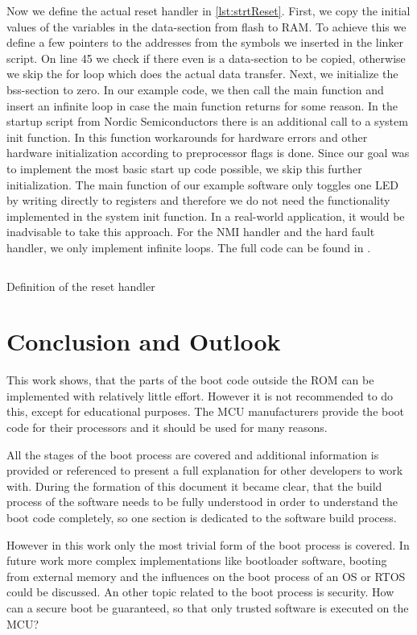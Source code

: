 \documentclass[a4paper,12pt]{article}
\begin{document}
Now we define the actual reset handler in \autoref{lst:strtReset}. First, we copy the initial values of the variables in the data-section from flash to \ac{RAM}. To achieve this we define a few pointers to the addresses from the symbols we inserted in the linker script. On line 45 we check if there even is a data-section to be copied, otherwise we skip the for loop which does the actual data transfer. Next, we initialize the bss-section to zero. In our example code, we then call the main function and insert an infinite loop in case the main function returns for some reason. In the startup script from Nordic Semiconductors there is an additional call to a system init function. In this function workarounds for hardware errors and other hardware initialization according to preprocessor flags is done. Since our goal was to implement the most basic start up code possible, we skip this further initialization. The main function of our example software only toggles one \ac{LED} by writing directly to registers and therefore we do not need the functionality implemented in the system init function. In a real-world application, it would be inadvisable to take this approach. For the \ac{NMI} handler and the hard fault handler, we only implement infinite loops. The full code can be found in \cite{lorv_eva1}. 

\begin{listing}[H]
  \inputminted[firstnumber=38]{c}{../code/nrf52840-from-scratch/reset_handler.c}
  \caption{Definition of the reset handler}
  \label{lst:strtReset}
\end{listing}

\newpage
\section{Conclusion and Outlook}
This work shows, that the parts of the boot code outside the \ac{ROM} can be implemented with relatively little effort. However it is not recommended to do this, except for educational purposes. The \ac{MCU} manufacturers provide the boot code for their processors and it should be used for many reasons.\par
All the stages of the boot process are covered and additional information is provided or referenced to present a full explanation for other developers to work with. During the formation of this document it became clear, that the build process of the software needs to be fully understood in order to understand the boot code completely, so one section is dedicated to the software build process.\par However in this work only the most trivial form of the boot process is covered. In future work more complex implementations like bootloader software, booting from external memory and the influences on the boot process of an \ac{OS} or \ac{RTOS} could be discussed. An other topic related to the boot process is security. How can a secure boot be guaranteed, so that only trusted software is executed on the \ac{MCU}?\newpage
\end{document}
